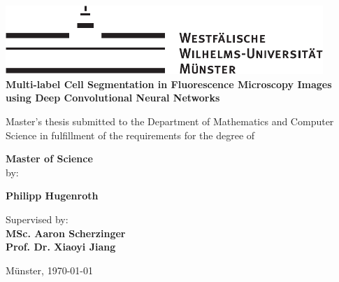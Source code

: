 \begin{centering}
\vspace*{\fill}
\includegraphics[width=12cm]{./img/wwu-logo-neu.pdf}\\[1.5cm]


{\textbf{ \Large
Multi-label Cell Segmentation in Fluorescence Microscopy Images using Deep Convolutional Neural Networks\\[1.2cm]
}}

{
Master's thesis submitted to the Department of Mathematics and Computer Science in fulfillment of the requirements for the degree of \\[2cm]
}

{\Large \textbf{Master of Science}}\\[4.5cm]

{
by:
}

{\textbf{ \large
Philipp Hugenroth\\[1cm]
}}


    

\hrulefill
                               
{
Supervised by:\\
\textbf{MSc. Aaron Scherzinger}\\
\textbf{Prof. Dr. Xiaoyi Jiang}\\[1cm]
}


{
Münster, \today
}
\vfill
\end{centering}